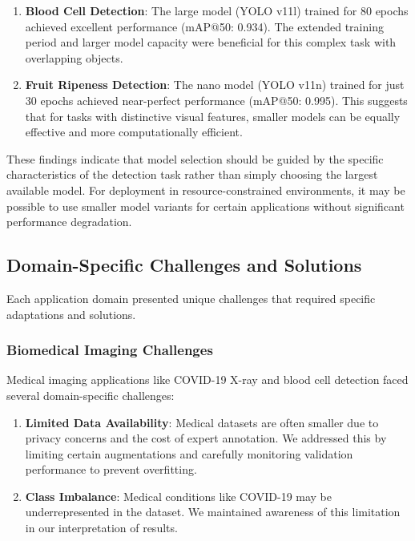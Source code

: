 \begin{multicols}{2}
\begin{enumerate}
    \item \textbf{Blood Cell Detection}: The large model (YOLO v11l) trained for 80 epochs achieved excellent performance (mAP@50: 0.934). The extended training period and larger model capacity were beneficial for this complex task with overlapping objects.
    
    \item \textbf{Fruit Ripeness Detection}: The nano model (YOLO v11n) trained for just 30 epochs achieved near-perfect performance (mAP@50: 0.995). This suggests that for tasks with distinctive visual features, smaller models can be equally effective and more computationally efficient.
\end{enumerate}

These findings indicate that model selection should be guided by the specific characteristics of the detection task rather than simply choosing the largest available model. For deployment in resource-constrained environments, it may be possible to use smaller model variants for certain applications without significant performance degradation.

\subsection{Domain-Specific Challenges and Solutions}

Each application domain presented unique challenges that required specific adaptations and solutions.

\subsubsection{Biomedical Imaging Challenges}

Medical imaging applications like COVID-19 X-ray and blood cell detection faced several domain-specific challenges:

\begin{enumerate}
    \item \textbf{Limited Data Availability}: Medical datasets are often smaller due to privacy concerns and the cost of expert annotation. We addressed this by limiting certain augmentations and carefully monitoring validation performance to prevent overfitting.
    
    \item \textbf{Class Imbalance}: Medical conditions like COVID-19 may be underrepresented in the dataset. We maintained awareness of this limitation in our interpretation of results.
    

\end{enumerate}
\end{multicols}

